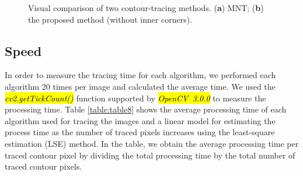 \documentclass[sensors,article,accept,moreauthors,pdftex,10pt,a4paper]{mdpi}
\begin{document}
\begin{figure}[H]
	\centering

	\caption{Visual comparison of two contour-tracing methods. (\textbf{a}) MNT; (\textbf{b}) the proposed method (without inner corners).}
	\label{fig:image17}
\end{figure}


\subsection{Speed}


In order to measure the tracing time for each algorithm, we performed each algorithm 20 times per image and calculated the average time. We used the \hl{\textit{cv2.getTickCount()}} function supported by \hl{\textit{OpenCV~3.0.0}} to measure the processing time. Table \ref{table:table8} shows the average processing time of each algorithm used for tracing the images and a linear model for estimating the process time as the number of traced pixels increases using the least-square estimation (LSE) method. In the table, we obtain the average processing time per traced contour pixel by dividing the total processing time by the total number of traced contour pixels.
\end{document}

